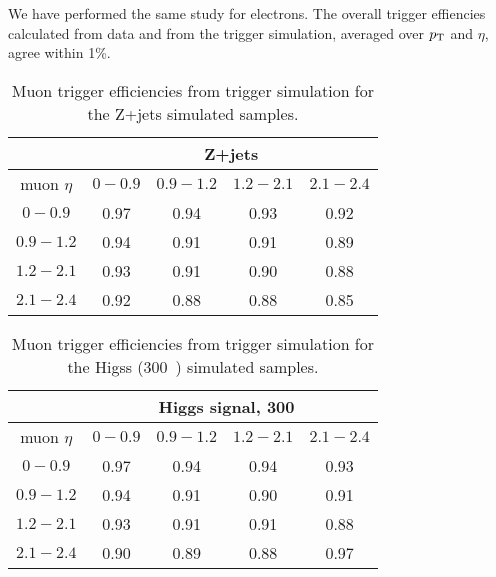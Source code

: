 We have performed the same study for electrons. The overall trigger effiencies calculated from data and
from the trigger simulation, averaged over $p_{\mathrm{T}}$ and $\eta$, agree within 1\%.


\begin{table}[h!]
\caption{Muon trigger efficiencies from trigger simulation for the Z+jets simulated samples.}
\label{tab:hltsimu}
\begin{center}
\begin{tabular}{| c| c| c| c| c|}
\cline{2-5}
\multicolumn{1}{c}{} & \multicolumn{4}{|c|}{Z+jets} \\ \hline
muon $\eta$ &$0-0.9$  &$0.9-1.2$        &$1.2-2.1$        &$2.1-2.4$ \\ \hline
$0-0.9$	       &0.97   &0.94   &0.93   &0.92   \\
$0.9-1.2$      &0.94   &0.91   &0.91   &0.89   \\
$1.2-2.1$      &0.93   &0.91   &0.90   &0.88   \\
$2.1-2.4$      &0.92   &0.88   &0.88   &0.85   \\
\hline
\end{tabular}
\end{center}
\end{table}


\begin{table}[h!]
\caption{Muon trigger efficiencies from trigger simulation for the Higss (300~\GeVcc{}) simulated samples.}
\label{tab:hltsimuhiggs}
\begin{center}
\begin{tabular}{|c|c|c|c|c|}
\cline{2-5}
\multicolumn{1}{c}{} & \multicolumn{4}{|c|}{Higgs signal, 300~\GeVcc{}} \\ \hline
muon $\eta$ & $0-0.9$  &$0.9-1.2$        &$1.2-2.1$        &$2.1-2.4$\\ \hline
$0-0.9$	       &0.97   &0.94   &0.94   &0.93\\
$0.9-1.2$      &0.94   &0.91   &0.90   &0.91\\
$1.2-2.1$      &0.93   &0.91   &0.91   &0.88\\
$2.1-2.4$      &0.90   &0.89   &0.88   &0.97\\
\hline
\end{tabular}
\end{center}
\end{table}






